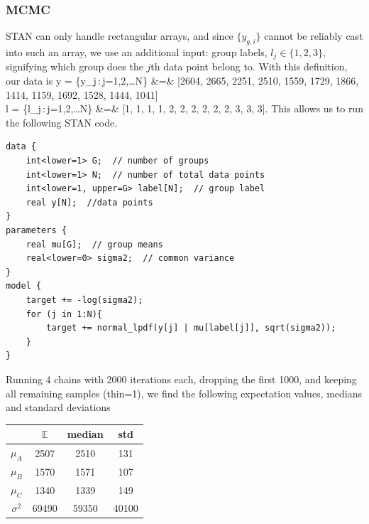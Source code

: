 \documentclass[10pt,oneside]{article}
\begin{document}
\subsubsection*{MCMC}
STAN can only handle rectangular arrays, and since $\{y_{g,i}\}$ cannot be reliably cast into such an array, we use an additional input: group labels, $l_j \in \{1,2,3\}$, signifying which group does the $j$th data point belong to. With this definition, our data is
\ba
	y = \{y_j\,:\,j=1,2,\ldots N\} &=& [2604, 2665, 2251, 2510, 1559, 1729, 1866, 1414, 1159, 1692, 1528, 1444, 1041]\\
	l = \{l_j\,:\,j=1,2,\ldots N\} &=& [1, 1, 1, 1, 2, 2, 2, 2, 2, 2, 3, 3, 3].
\ea
This allows us to run the following STAN code.
\begin{lstlisting}[language={}]
data {
    int<lower=1> G;  // number of groups
    int<lower=1> N;  // number of total data points
    int<lower=1, upper=G> label[N];  // group label
    real y[N];  //data points
}
parameters {
    real mu[G];  // group means
    real<lower=0> sigma2;  // common variance
}
model {
    target += -log(sigma2);
    for (j in 1:N){
        target += normal_lpdf(y[j] | mu[label[j]], sqrt(sigma2));
    }
}
\end{lstlisting}
Running 4 chains with 2000 iterations each, dropping the first 1000, and keeping all remaining samples (thin=1), we find the following expectation values, medians and standard deviations
\begin{table}[h]
\centering
\begin{tabular}{c|ccc}
		& $\mathbb{E}$ & median & std \\
		\hline
	$\mu_A$ & 2507 & 2510 & 131 \\
	$\mu_B$ & 1570 & 1571 & 107 \\
	$\mu_C$ & 1340 & 1339 & 149 \\ 
	$\sigma^2$ & 69490 & 59350 & 40100 \\ 
	\hline
\end{tabular}
\end{table}
\end{document}
